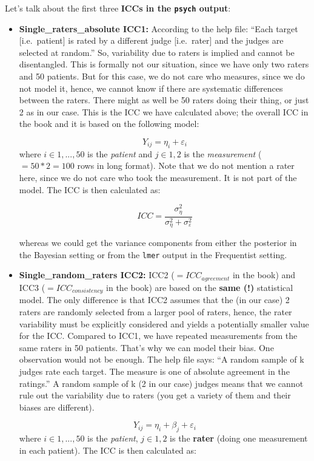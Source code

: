 \documentclass[
]{book}
\begin{document}
Let's talk about the first three \textbf{ICCs in the \texttt{psych} output}:

\begin{itemize}
\item
  \textbf{Single\_raters\_absolute ICC1:}
  According to the help file: ``Each target {[}i.e.~patient{]} is rated by a different
  judge {[}i.e.~rater{]} and the judges are selected at random.'' So, variability due to raters
  is implied and cannot be disentangled.
  This is formally not our situation, since we have only two raters and
  50 patients. But for this case, we do not care who measures, since we do not
  model it, hence, we cannot know if there are systematic differences between
  the raters. There might as well be 50 raters doing their thing, or just 2 as in our case.
  This is the ICC we have calculated above; the overall ICC
  in the book and it is based on the following model:

  \[Y_{ij} = \eta_i + \varepsilon_i\]
  where \(i \in {1,...,50}\) is the \emph{patient} and \(j \in {1,2}\) is the \emph{measurement}
  (\(=50*2=100\) rows in long format).
  Note that we do not mention a rater here, since we do not care who took the
  measurement. It is not part of the model. The ICC is then calculated as:

  \[ICC = \frac{\sigma_{\eta}^2}{\sigma_{\eta}^2 + \sigma_{\varepsilon}^2}\]

  whereas we could get the variance components from either the posterior in the Bayesian
  setting or from the \texttt{lmer} output in the Frequentist setting.
\item
  \textbf{Single\_random\_raters ICC2:}
  ICC2 (\(=ICC_{agreement}\) in the book) and ICC3 (\(=ICC_{consistency}\) in the book)
  are based on the \textbf{same (!)} statistical model. The only difference is
  that ICC2 assumes that the (in our case) 2 raters are randomly selected from a larger pool of raters,
  hence, the rater variability must be explicitly considered and yields a potentially smaller
  value for the ICC. Compared to ICC1, we have repeated measurements from the same raters
  in 50 patients. That's why we can model their bias. One observation would not be enough.
  The help file says: ``A random sample of k judges rate each target.
  The measure is one of absolute agreement in the ratings.''
  A random sample of k (2 in our case) judges means that we cannot rule out the variability
  due to raters (you get a variety of them and their biases are different).

  \[Y_{ij} = \eta_i + \beta_j + \varepsilon_i\]
  where \(i \in {1,...,50}\) is the \emph{patient}, \(j \in {1,2}\) is the \textbf{rater}
  (doing one measurement in each patient). The ICC is then calculated as:


\end{itemize}
\end{document}
